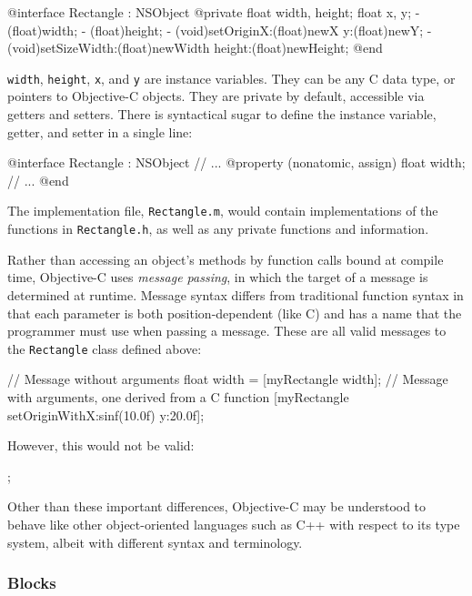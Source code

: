 \begin{objc}
@interface Rectangle : NSObject {
    @private
    float width, height;
    float x, y;
}
- (float)width;
- (float)height;
- (void)setOriginX:(float)newX y:(float)newY;
- (void)setSizeWidth:(float)newWidth height:(float)newHeight;
@end
\end{objc}

\texttt{width}, \texttt{height}, \texttt{x}, and \texttt{y} are instance
variables. They can be any C data type, or pointers to Objective-C objects. They
are private by default, accessible via getters and setters. There is syntactical
sugar to define the instance variable, getter, and setter in a single line:

\begin{objc}
@interface Rectangle : NSObject {
    // ...
}
@property (nonatomic, assign) float width;
// ...
@end
\end{objc}

The implementation file, \texttt{Rectangle.m}, would contain implementations of
the functions in \texttt{Rectangle.h}, as well as any private functions and
information.

Rather than accessing an object's methods by function calls bound at compile
time, Objective-C uses \emph{message passing}, in which the target of a message
is determined at runtime. Message syntax differs from traditional function
syntax in that each parameter is both position-dependent (like C) and has a name
that the programmer must use when passing a message. These are all valid
messages to the \texttt{Rectangle} class defined above:

\begin{objc}
// Message without arguments
float width = [myRectangle width];
// Message with arguments, one derived from a C function
[myRectangle setOriginWithX:sinf(10.0f) y:20.0f];
\end{objc}

However, this would not be valid:

\begin{objc}
;
\end{objc}

Other than these important differences, Objective-C may be understood to behave
like other object-oriented languages such as C++ with respect to its type
system, albeit with different syntax and terminology.

\subsubsection{Blocks}
\label{sect:objc_blocks}

